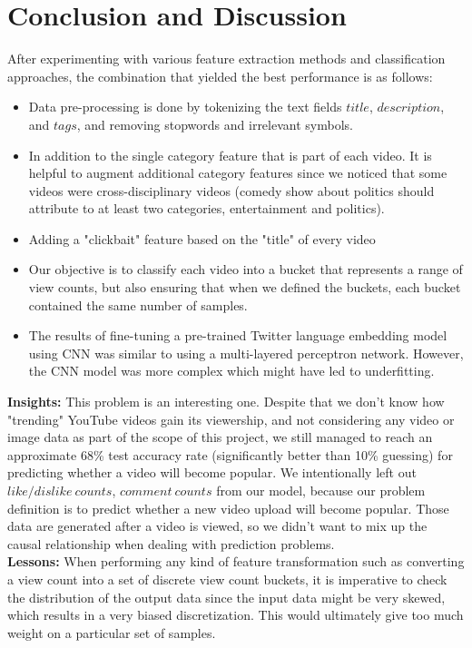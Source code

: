 \documentclass[english]{article}
\begin{document}
\section{Conclusion and Discussion}

After experimenting with various feature extraction methods and classification approaches, the combination that yielded the best performance is as follows:

\begin{itemize}
    \item Data pre-processing is done by tokenizing the text fields $title$, $description$, and $tags$, and removing stopwords and irrelevant symbols.
    \item In addition to the single category feature that is part of each video. It is helpful to augment additional category features since we noticed that some videos were cross-disciplinary videos (comedy show about politics should attribute to at least two categories, entertainment and politics).
    \item Adding a "clickbait" feature based on the "title" of every video
    \item Our objective is to classify each video into a bucket that represents a range of view counts, but also ensuring that when we defined the buckets, each bucket contained the same number of samples.
    \item The results of fine-tuning a pre-trained Twitter language embedding model using CNN was similar to using a multi-layered perceptron network. However, the CNN model was more complex which might have led to underfitting. 
    
\end{itemize}

\textbf{Insights:} This problem is an interesting one. Despite that we don't know how "trending" YouTube videos gain its viewership, and not considering any video or image data as part of the scope of this project, we still managed to reach an approximate 68\% test accuracy rate (significantly better than 10\% guessing) for predicting whether a video will become popular. We intentionally left out $like/dislike\ counts$, $comment\ counts$ from our model, because our problem definition is to predict whether a new video upload will become popular. Those data are generated after a video is viewed, so we didn't want to mix up the causal relationship when dealing with prediction problems.\\

\textbf{Lessons:} When performing any kind of feature transformation such as converting a view count into a set of discrete view count buckets, it is imperative to check the distribution of the output data since the input data might be very skewed, which results in a very biased discretization. This would ultimately give too much weight on a particular set of samples. \\
\end{document}
